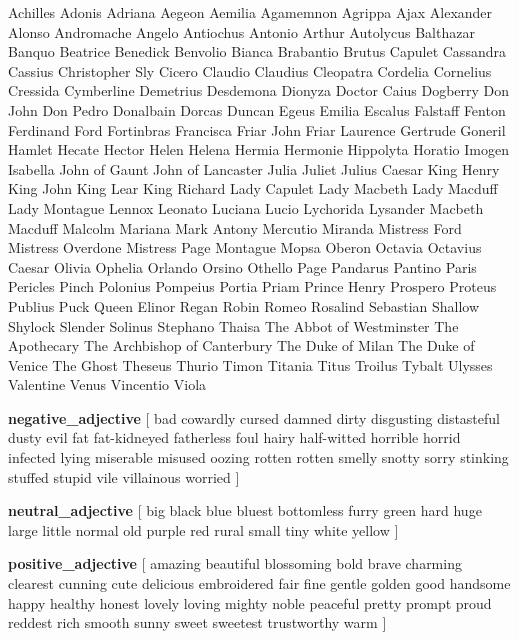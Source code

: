\documentclass[a0paper,fontscale=0.285]{baposter} %
\begin{document}
\begin{poster}
{
Achilles
Adonis
Adriana
Aegeon
Aemilia
Agamemnon
Agrippa
Ajax
Alexander
Alonso
Andromache
Angelo
Antiochus
Antonio
Arthur
Autolycus
Balthazar
Banquo
Beatrice
Benedick
Benvolio
Bianca
Brabantio
Brutus
Capulet
Cassandra
Cassius
Christopher Sly
Cicero
Claudio
Claudius
Cleopatra
Cordelia
Cornelius
Cressida
Cymberline
Demetrius
Desdemona
Dionyza
Doctor Caius
Dogberry
Don John
Don Pedro
Donalbain
Dorcas
Duncan
Egeus
Emilia
Escalus
Falstaff
Fenton
Ferdinand
Ford
Fortinbras
Francisca
Friar John
Friar Laurence
Gertrude
Goneril
Hamlet
Hecate
Hector
Helen
Helena
Hermia
Hermonie
Hippolyta
Horatio
Imogen
Isabella
John of Gaunt
John of Lancaster
Julia
Juliet
Julius Caesar
King Henry
King John
King Lear
King Richard
Lady Capulet
Lady Macbeth
Lady Macduff
Lady Montague
Lennox
Leonato
Luciana
Lucio
Lychorida
Lysander
Macbeth
Macduff
Malcolm
Mariana
Mark Antony
Mercutio
Miranda
Mistress Ford
Mistress Overdone
Mistress Page
Montague
Mopsa
Oberon
Octavia
Octavius Caesar
Olivia
Ophelia
Orlando
Orsino
Othello
Page
Pandarus
Pantino
Paris
Pericles
Pinch
Polonius
Pompeius
Portia
Priam
Prince Henry
Prospero
Proteus
Publius
Puck
Queen Elinor
Regan
Robin
Romeo
Rosalind
Sebastian
Shallow
Shylock
Slender
Solinus
Stephano
Thaisa
The Abbot of Westminster
The Apothecary
The Archbishop of Canterbury
The Duke of Milan
The Duke of Venice
The Ghost
Theseus
Thurio
Timon
Titania
Titus
Troilus
Tybalt
Ulysses
Valentine
Venus
Vincentio
Viola}

{\textbf{negative\_adjective} {[  bad   
	 cowardly   
	 cursed   
	 damned   
	 dirty   
	 disgusting   
	 distasteful   
	 dusty   
	 evil   
	 fat   
	 fat-kidneyed   
	 fatherless   
	 foul   
	 hairy   
	 half-witted   
	 horrible   
	 horrid   
	 infected   
	 lying   
	 miserable   
	 misused   
	 oozing   
	 rotten   
	 rotten   
	 smelly   
	 snotty   
	 sorry   
	 stinking   
	 stuffed   
	 stupid   
	 vile   
	 villainous   
	 worried  ]}

\textbf{neutral\_adjective} {[  big   
	 black   
	 blue   
	 bluest   
	 bottomless   
	 furry   
	 green   
	 hard   
	 huge   
	 large   
	 little   
	 normal   
	 old   
	 purple   
	 red   
	 rural   
	 small   
	 tiny   
	 white   
	 yellow  ]}

\textbf{positive\_adjective} {[  amazing   
	 beautiful   
	 blossoming   
	 bold   
	 brave   
	 charming   
	 clearest   
	 cunning   
	 cute   
	 delicious   
	 embroidered   
	 fair   
	 fine   
	 gentle   
	 golden   
	 good   
	 handsome   
	 happy   
	 healthy   
	 honest   
	 lovely   
	 loving   
	 mighty   
	 noble   
	 peaceful   
	 pretty   
	 prompt   
	 proud   
	 reddest   
	 rich   
	 smooth   
	 sunny   
	 sweet   
	 sweetest   
	 trustworthy   
	 warm  ]}

}
\end{poster}
\end{document}
